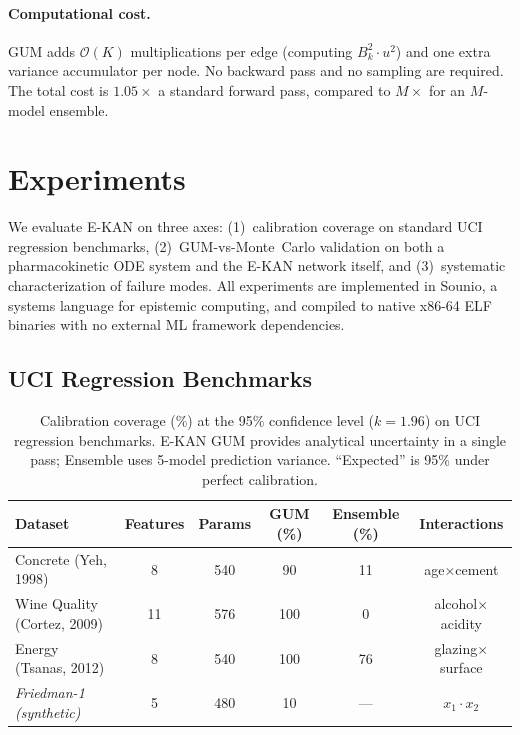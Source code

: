 \documentclass{article}
\begin{document}
\paragraph{Computational cost.}
GUM adds $\mathcal{O}(K)$ multiplications per edge (computing
$B_k^2 \cdot u^2$) and one extra variance accumulator per node.  No backward
pass and no sampling are required.  The total cost is $1.05\times$ a standard
forward pass, compared to $M\times$ for an $M$-model ensemble.

\section{Experiments}
\label{sec:experiments}

We evaluate E-KAN on three axes: (1)~calibration coverage on standard UCI
regression benchmarks, (2)~GUM-vs-Monte~Carlo validation on both a
pharmacokinetic ODE system and the E-KAN network itself, and (3)~systematic
characterization of failure modes.  All experiments are implemented in Sounio,
a systems language for epistemic computing, and compiled to native x86-64 ELF
binaries with no external ML framework dependencies.

\subsection{UCI Regression Benchmarks}
\label{sec:uci}


\begin{table}[t]
\centering
\caption{Calibration coverage (\%) at the 95\% confidence level ($k=1.96$) on
UCI regression benchmarks.  E-KAN GUM provides analytical uncertainty in a
single pass; Ensemble uses 5-model prediction variance.  ``Expected'' is
95\% under perfect calibration.}
\label{tab:uci}
\begin{tabular}{@{}lccccc@{}}
\toprule
\textbf{Dataset} & \textbf{Features} & \textbf{Params} &
  \textbf{GUM (\%)} & \textbf{Ensemble (\%)} & \textbf{Interactions} \\
\midrule
Concrete (Yeh, 1998)   & 8  & 540 & 90  & 11 & age$\times$cement \\
Wine Quality (Cortez, 2009) & 11 & 576 & 100 &  0 & alcohol$\times$acidity \\
Energy (Tsanas, 2012)  & 8  & 540 & 100 & 76 & glazing$\times$surface \\
\midrule
\textit{Friedman-1 (synthetic)} & 5 & 480 & 10 & --- & $x_1 \cdot x_2$ \\
\bottomrule
\end{tabular}
\end{table}
\end{document}
